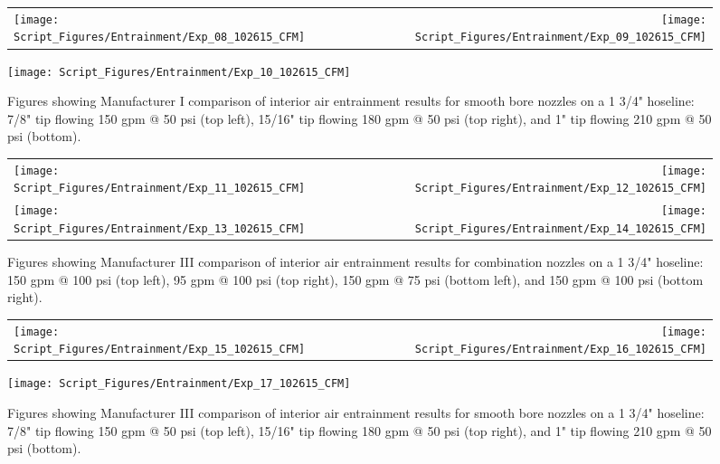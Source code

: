 \documentclass[12pt,oneside]{book}
\begin{document}
\begin{figure}[!ht]
\begin{tabular*}{\textwidth}{lr}
\texttt{[image: Script\_Figures/Entrainment/Exp\_08\_102615\_CFM]} &
\texttt{[image: Script\_Figures/Entrainment/Exp\_09\_102615\_CFM]} \\
\end{tabular*}
\centering
\texttt{[image: Script\_Figures/Entrainment/Exp\_10\_102615\_CFM]} 
\caption{Figures showing Manufacturer I comparison of interior air entrainment results for smooth bore nozzles on a 1 3/4" hoseline: 7/8" tip flowing 150 gpm @ 50 psi (top left), 15/16" tip flowing 180 gpm @ 50 psi (top right), and 1" tip flowing 210 gpm @ 50 psi (bottom).}
\label{fig:1_5_Interior_Smooth_Bore_Manufacturer_I}
\end{figure}

\clearpage

\begin{figure}[!ht]
\begin{tabular*}{\textwidth}{lr}
\texttt{[image: Script\_Figures/Entrainment/Exp\_11\_102615\_CFM]} &
\texttt{[image: Script\_Figures/Entrainment/Exp\_12\_102615\_CFM]} \\
\texttt{[image: Script\_Figures/Entrainment/Exp\_13\_102615\_CFM]} &
\texttt{[image: Script\_Figures/Entrainment/Exp\_14\_102615\_CFM]} \\
\end{tabular*}
\caption{Figures showing Manufacturer III comparison of interior air entrainment results for combination nozzles on a 1 3/4" hoseline: 150 gpm @ 100 psi (top left), 95 gpm @ 100 psi (top right), 150 gpm @ 75 psi (bottom left), and 150 gpm @ 100 psi (bottom right).}
\label{fig:1_5_Interior_Combination_Manufacturer_III}
\end{figure}

\clearpage

\begin{figure}[!ht]
\begin{tabular*}{\textwidth}{lr}
\texttt{[image: Script\_Figures/Entrainment/Exp\_15\_102615\_CFM]} &
\texttt{[image: Script\_Figures/Entrainment/Exp\_16\_102615\_CFM]} \\
\end{tabular*}
\centering
\texttt{[image: Script\_Figures/Entrainment/Exp\_17\_102615\_CFM]} 
\caption{Figures showing Manufacturer III comparison of interior air entrainment results for smooth bore nozzles on a 1 3/4" hoseline: 7/8" tip flowing 150 gpm @ 50 psi (top left), 15/16" tip flowing 180 gpm @ 50 psi (top right), and 1" tip flowing 210 gpm @ 50 psi (bottom).}
\label{fig:1_5_Interior_Smooth_Bore_Manufacturer_III}
\end{figure}
\end{document}
